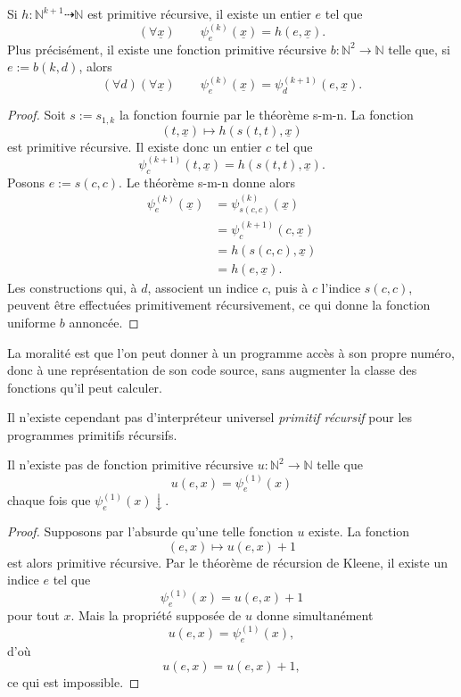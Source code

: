 \begin{thm}
\label{kleene-recursion-theorem-pr}
Si $h\colon\mathbb{N}^{k+1}\dasharrow\mathbb{N}$ est primitive
récursive, il existe un entier $e$ tel que
\[
(\forall\underline{x})\qquad
\psi_e^{(k)}(\underline{x})=h(e,\underline{x}).
\]
Plus précisément, il existe une fonction primitive récursive
$b\colon\mathbb{N}^2\to\mathbb{N}$ telle que, si $e:=b(k,d)$, alors
\[
(\forall d)(\forall\underline{x})\qquad
\psi_e^{(k)}(\underline{x})
 =\psi_d^{(k+1)}(e,\underline{x}).
\]
\end{thm}

\begin{proof}
Soit $s:=s_{1,k}$ la fonction fournie par le théorème s-m-n.  La
fonction
\[
(t,\underline{x})\mapsto h(s(t,t),\underline{x})
\]
est primitive récursive.  Il existe donc un entier $c$ tel que
\[
\psi_c^{(k+1)}(t,\underline{x})
 =h(s(t,t),\underline{x}).
\]
Posons $e:=s(c,c)$.  Le théorème s-m-n donne alors
\[
\begin{aligned}
\psi_e^{(k)}(\underline{x})
 &=\psi_{s(c,c)}^{(k)}(\underline{x})\\
 &=\psi_c^{(k+1)}(c,\underline{x})\\
 &=h(s(c,c),\underline{x})\\
 &=h(e,\underline{x}).
\end{aligned}
\]
Les constructions qui, à $d$, associent un indice $c$, puis à $c$
l'indice $s(c,c)$, peuvent être effectuées primitivement récursivement,
ce qui donne la fonction uniforme $b$ annoncée.
\end{proof}

La moralité est que l'on peut donner à un programme accès à son propre
numéro, donc à une représentation de son code source, sans augmenter
la classe des fonctions qu'il peut calculer.

\thingy Il n'existe cependant pas d'interpréteur universel
\emph{primitif récursif} pour les programmes primitifs récursifs.

\begin{thm}\label{primitive-recursive-no-universality}
Il n'existe pas de fonction primitive récursive
$u\colon\mathbb{N}^2\to\mathbb{N}$ telle que
\[
u(e,x)=\psi_e^{(1)}(x)
\]
chaque fois que $\psi_e^{(1)}(x)\downarrow$.
\end{thm}

\begin{proof}
Supposons par l'absurde qu'une telle fonction $u$ existe.  La fonction
\[
(e,x)\mapsto u(e,x)+1
\]
est alors primitive récursive.  Par le théorème de récursion de Kleene,
il existe un indice $e$ tel que
\[
\psi_e^{(1)}(x)=u(e,x)+1
\]
pour tout $x$.  Mais la propriété supposée de $u$ donne simultanément
\[
u(e,x)=\psi_e^{(1)}(x),
\]
d'où
\[
u(e,x)=u(e,x)+1,
\]
ce qui est impossible.
\end{proof}


